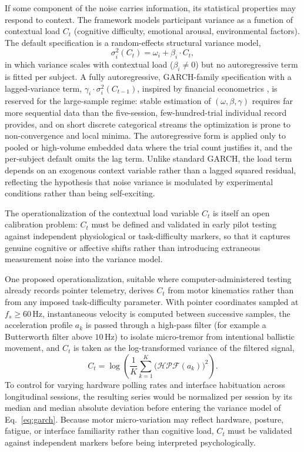 \documentclass[11pt,letterpaper]{article}
\begin{document}
If some component of the noise carries information, its statistical properties may respond to context. The framework models participant variance as a function of contextual load $C_t$ (cognitive difficulty, emotional arousal, environmental factors). The default specification is a random-effects structural variance model,
\begin{equation}
\sigma_i^2(C_t) = \omega_i + \beta_i \cdot C_t,
\label{eq:garch}
\end{equation}
in which variance scales with contextual load ($\beta_i \neq 0$) but no autoregressive term is fitted per subject. A fully autoregressive, GARCH-family specification with a lagged-variance term, $\gamma_i \cdot \sigma_i^2(C_{t-1})$, inspired by financial econometrics \cite{bollerslev1986}, is reserved for the large-sample regime: stable estimation of $(\omega, \beta, \gamma)$ requires far more sequential data than the five-session, few-hundred-trial individual record provides, and on short discrete categorical streams the optimization is prone to non-convergence and local minima. The autoregressive form is applied only to pooled or high-volume embedded data where the trial count justifies it, and the per-subject default omits the lag term. Unlike standard GARCH, the load term depends on an exogenous context variable rather than a lagged squared residual, reflecting the hypothesis that noise variance is modulated by experimental conditions rather than being self-exciting.

The operationalization of the contextual load variable $C_t$ is itself an open calibration problem: $C_t$ must be defined and validated in early pilot testing against independent physiological or task-difficulty markers, so that it captures genuine cognitive or affective shifts rather than introducing extraneous measurement noise into the variance model.

One proposed operationalization, suitable where computer-administered testing already records pointer telemetry, derives $C_t$ from motor kinematics rather than from any imposed task-difficulty parameter. With pointer coordinates sampled at $f_s \geq 60$\,Hz, instantaneous velocity is computed between successive samples, the acceleration profile $a_k$ is passed through a high-pass filter (for example a Butterworth filter above $10$\,Hz) to isolate micro-tremor from intentional ballistic movement, and $C_t$ is taken as the log-transformed variance of the filtered signal,
\begin{equation}
C_t = \log\!\left(\frac{1}{K}\sum_{k=1}^{K}\big(\mathcal{HPF}(a_k)\big)^2\right).
\label{eq:ctkinematic}
\end{equation}
To control for varying hardware polling rates and interface habituation across longitudinal sessions, the resulting series would be normalized per session by its median and median absolute deviation before entering the variance model of Eq.~\ref{eq:garch}. Because motor micro-variation may reflect hardware, posture, fatigue, or interface familiarity rather than cognitive load, $C_t$ must be validated against independent markers before being interpreted psychologically.
\end{document}
